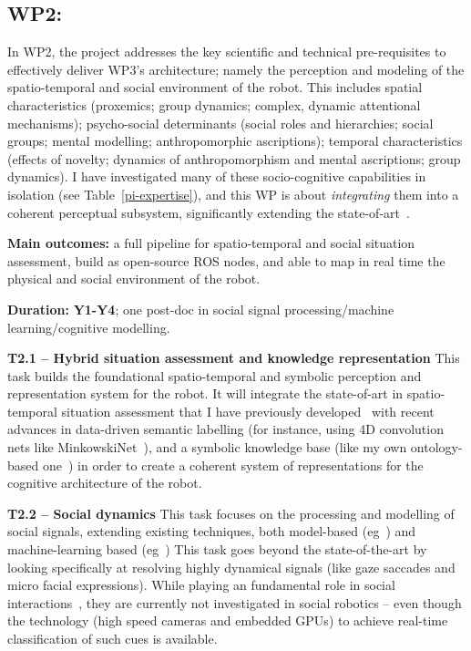 \subsection{WP2: \textbf{\wpTwo}}


In WP2, the project addresses the key scientific and technical pre-requisites to
effectively deliver WP3's architecture; namely the perception and modeling of
the spatio-temporal and social environment of the robot. This includes spatial
characteristics (proxemics; group dynamics; complex, dynamic attentional
mechanisms); psycho-social determinants (social roles and hierarchies; social
groups; mental modelling; anthropomorphic ascriptions); temporal characteristics
(effects of novelty; dynamics of anthropomorphism and mental ascriptions; group
dynamics). I have investigated many of these socio-cognitive capabilities in
isolation (see Table~\ref{pi-expertise}), and this WP is about
\emph{integrating} them into a coherent perceptual subsystem, significantly
extending the state-of-art~\cite{lemaignan2017artificial, baxter2016cognitive}.

\begin{framed}
    \textbf{Main outcomes:} a full pipeline for
spatio-temporal and social situation assessment, build as open-source ROS nodes,
and able to map in real time the physical and social environment of the robot.

    \textbf{Duration:} \textbf{Y1-Y4}; one post-doc in social
signal processing/machine learning/cognitive modelling.
\end{framed}

\textbf{T2.1 -- Hybrid situation assessment and knowledge representation} This
task builds the foundational spatio-temporal and symbolic perception and
representation system for the robot. It will integrate the state-of-art in
spatio-temporal situation assessment that I have previously
developed~\cite{lemaignan2018underworlds, sallami2019simulation} with recent
advances in data-driven semantic labelling (for instance, using 4D convolution
nets like MinkowskiNet~\cite{choy20194d}), and a symbolic knowledge base (like
my own ontology-based one~\cite{lemaignan2010oro}) in order to create a coherent
system of representations for the cognitive architecture of the robot.

\textbf{T2.2 -- Social dynamics} This task focuses on the processing and
modelling of social signals, extending existing techniques, both model-based
(eg~\cite{lemaignan2016realtime,others}) and machine-learning based
(eg~\cite{chetouani,others}) This task goes beyond the state-of-the-art by
looking specifically at resolving highly dynamical signals (like gaze saccades
and micro facial expressions). While playing an fundamental role in social
interactions~\cite{citeneeded}, they are currently not investigated in social
robotics -- even though the technology (high speed cameras and embedded GPUs) to
achieve real-time classification of such cues is available.

